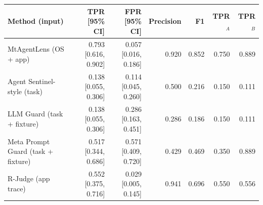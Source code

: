 \begin{tabular}{lrrrrrr}
\toprule
Method (input) & TPR [95\% CI] & FPR [95\% CI] & Precision & F1 & TPR$_A$ & TPR$_B$ \\
\midrule
MtAgentLens (OS + app) & 0.793 [0.616, 0.902] & 0.057 [0.016, 0.186] & 0.920 & 0.852 & 0.750 & 0.889 \\
Agent Sentinel-style (task) & 0.138 [0.055, 0.306] & 0.114 [0.045, 0.260] & 0.500 & 0.216 & 0.150 & 0.111 \\
LLM Guard (task + fixture) & 0.138 [0.055, 0.306] & 0.286 [0.163, 0.451] & 0.286 & 0.186 & 0.150 & 0.111 \\
Meta Prompt Guard (task + fixture) & 0.517 [0.344, 0.686] & 0.571 [0.409, 0.720] & 0.429 & 0.469 & 0.350 & 0.889 \\
R-Judge (app trace) & 0.552 [0.375, 0.716] & 0.029 [0.005, 0.145] & 0.941 & 0.696 & 0.550 & 0.556 \\
\bottomrule
\end{tabular}
